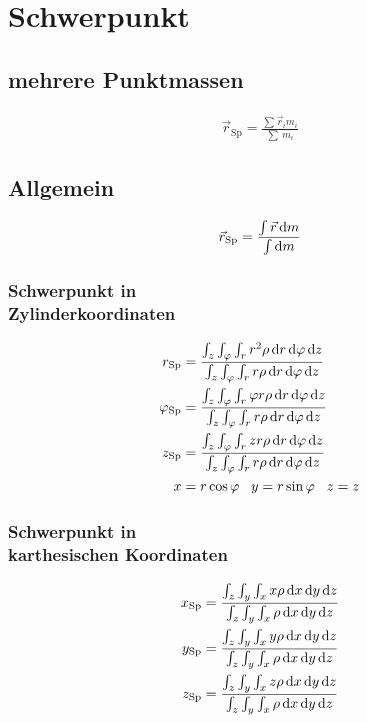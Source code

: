 \section{Schwerpunkt}

\begin{multicols}{2}{}
\subsection*{mehrere Punktmassen}
\begin{align*}
\vec{r}_{\text{Sp}}=\frac{\sum\vec{r}_i m_i}{\sum\ m_i}
\end{align*}


\subsection*{Allgemein}
\begin{align*}
\vec{r}_{\text{Sp}}=\frac{\int \vec{r}\mathop{}\!\mathrm{d} m}{\int \mathop{}\!\mathrm{d} m}
\end{align*}
\end{multicols}

\begin{multicols}{2}{}
\subsubsection{Schwerpunkt in \\Zylinderkoordinaten}
\begin{align*}
r_{\text{Sp}}&=\frac{\int_z\int_\varphi\int_r r^2\rho \diff r \diff \varphi \diff z }{\int_z\int_\varphi\int_r r\rho \diff r \diff \varphi \diff z }\\
\varphi_{\text{Sp}}&=\frac{\int_z\int_\varphi\int_r \varphi r\rho \diff r \diff \varphi \diff z }{\int_z\int_\varphi\int_r r\rho \diff r \diff \varphi \diff z }\\
z_{\text{Sp}}&=\frac{\int_z\int_\varphi\int_r z r\rho \diff r \diff \varphi \diff z }{\int_z\int_\varphi\int_r r\rho \diff r \diff \varphi \diff z }\\
x&=r\cos{\varphi}\hspace{3mm}y=r\sin{\varphi}\hspace{3mm}z=z
\end{align*}

\subsubsection{Schwerpunkt in \\karthesischen Koordinaten}
\begin{align*}
x_{\text{Sp}}&=\frac{\int_z\int_y\int_x x\rho \diff x \diff y \diff z }{\int_z\int_y\int_x \rho \diff x \diff y \diff z }\\
y_{\text{Sp}}&=\frac{\int_z\int_y\int_x y\rho \diff x \diff y \diff z }{\int_z\int_y\int_x \rho \diff x \diff y \diff z }\\
z_{\text{Sp}}&=\frac{\int_z\int_y\int_x z\rho \diff x \diff y \diff z }{\int_z\int_y\int_x \rho \diff x \diff y \diff z }
\end{align*}
\hfill
\end{multicols}


